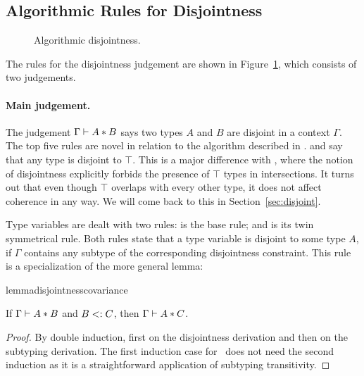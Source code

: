 \subsection{Algorithmic Rules for Disjointness}

\begin{figure}[!t]
  \begin{spacing}{0.5}
  \end{spacing}

  \caption{Algorithmic disjointness.}
  \label{fig:disjointness}
\end{figure}

The rules for the disjointness judgement are shown in
Figure~\ref{fig:disjointness}, which consists of two judgements.
 
\paragraph{Main judgement.} The judgement $\Gamma \vdash A * B$ says
two types $A$ and $B$ are disjoint in a context $\Gamma$.
The top five rules are novel in relation to the algorithm described in \oldname.
 and  say that any type is disjoint to 
$\top$.
This is a major difference with \oldname, where the notion of disjointness explicitly forbids
the presence of $\top$ types in intersections.
It turns out that even though $\top$ overlaps with every other type,
it does not affect coherence in any way.
We will come back to this in Section~\ref{sec:disjoint}.
 
Type variables are dealt with two rules:
 is the base rule; and 
is its twin symmetrical rule. 
Both rules state that a type variable is disjoint to some type $A$, if $\Gamma$ contains any
subtype of the corresponding disjointness constraint. 
This rule is a specialization of the more general lemma:

\begin{restatable}{lemma}{disjointnesscovariance}
  \label{lemma:disjointness-covariance}

  If $\Gamma \vdash A * B$ and $B <: C$, then $\Gamma \vdash A * C$.
\end{restatable}
\begin{proof}
By double induction, first on the disjointness derivation and then on the subtyping derivation.
The first induction case for~ does not need the second induction as it is 
a straightforward application of subtyping transitivity. 
\end{proof}

